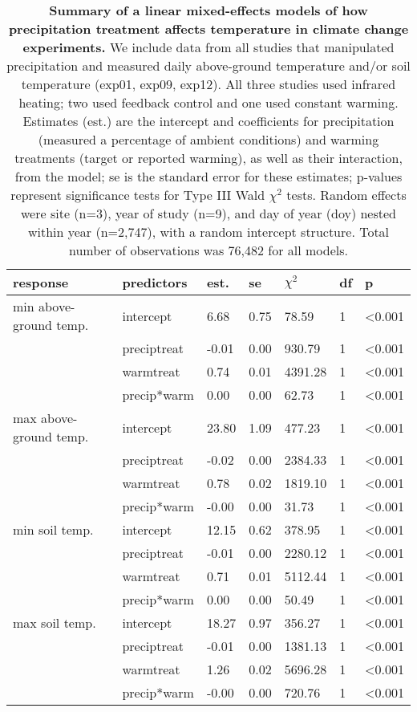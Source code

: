 \documentclass{article}
\begin{document}
\begin{table}[ht]
\centering
\caption{\textbf{Summary of a linear mixed-effects models of how precipitation treatment affects temperature in climate change experiments.} We include data from all studies that manipulated precipitation and measured daily above-ground temperature and/or soil temperature (exp01, exp09, exp12). All three studies used infrared heating; two used feedback control and one used constant warming. Estimates (est.) are the intercept and coefficients for precipitation (measured a percentage of ambient conditions) and warming treatments (target or reported warming), as well as their interaction, from the model; se is the standard error for these estimates; p-values represent significance tests for Type III Wald $\chi^{2}$ tests. Random effects were site (n=3), year of study (n=9), and day of year (doy) nested within year (n=2,747), with a random intercept structure. Total number of observations was 76,482 for all models.} 
\label{table:preciptemp}
\begingroup\footnotesize
\begin{tabular}{|p{}|p{}|p{}|p{}|p{}|p{}|p{}|}
  \hline
response & predictors & est. & se & $\chi^{2}$ & df & p \\ 
  \hline
min above-ground temp. & intercept & 6.68 & 0.75 & 78.59 & 1 & <0.001 \\ 
   & preciptreat & -0.01 & 0.00 & 930.79 & 1 & <0.001 \\ 
   & warmtreat & 0.74 & 0.01 & 4391.28 & 1 & <0.001 \\ 
   & precip*warm & 0.00 & 0.00 & 62.73 & 1 & <0.001 \\ 
   \hline
max above-ground temp. & intercept & 23.80 & 1.09 & 477.23 & 1 & <0.001 \\ 
   & preciptreat & -0.02 & 0.00 & 2384.33 & 1 & <0.001 \\ 
   & warmtreat & 0.78 & 0.02 & 1819.10 & 1 & <0.001 \\ 
   & precip*warm & -0.00 & 0.00 & 31.73 & 1 & <0.001 \\ 
   \hline
min soil temp. & intercept & 12.15 & 0.62 & 378.95 & 1 & <0.001 \\ 
   & preciptreat & -0.01 & 0.00 & 2280.12 & 1 & <0.001 \\ 
   & warmtreat & 0.71 & 0.01 & 5112.44 & 1 & <0.001 \\ 
   & precip*warm & 0.00 & 0.00 & 50.49 & 1 & <0.001 \\ 
   \hline
max soil temp. & intercept & 18.27 & 0.97 & 356.27 & 1 & <0.001 \\ 
   & preciptreat & -0.01 & 0.00 & 1381.13 & 1 & <0.001 \\ 
   & warmtreat & 1.26 & 0.02 & 5696.28 & 1 & <0.001 \\ 
   & precip*warm & -0.00 & 0.00 & 720.76 & 1 & <0.001 \\ 
   \hline
\end{tabular}
\endgroup
\end{table}  %
\end{document}
